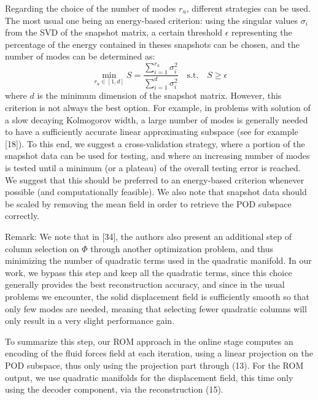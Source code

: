 \documentclass[11pt]{article}
\begin{document}
Regarding the choice of the number of modes $r_u$, different strategies can be used. The most usual one being an energy-based criterion: using the singular values $\sigma_i$ from the SVD of the snapshot matrix, a certain threshold $\epsilon$ representing the percentage of the energy contained in theses snapshots can be chosen, and the number of modes can be determined as:
\begin{equation}
\tag{18}
\min_{r_u \in [1,d]}
S =
\frac{\sum_{i=1}^{r_u}\sigma_i^{2}}{\sum_{i=1}^{d}\sigma_i^{2}}
\quad \text{s.t.} \quad S \ge \epsilon
\end{equation}
where $d$ is the minimum dimension of the snapshot matrix. However, this criterion is not always the best option. For example, in problems with solution of a slow decaying Kolmogorov width, a large number of modes is generally needed to have a sufficiently accurate linear approximating subspace (see for example [18]). To this end, we suggest a cross-validation strategy, where a portion of the snapshot data can be used for testing, and where an increasing number of modes is tested until a minimum (or a plateau) of the overall testing error is reached. We suggest that this should be preferred to an energy-based criterion whenever possible (and computationally feasible). We also note that snapshot data should be scaled by removing the mean field in order to retrieve the POD subspace correctly.

Remark: We note that in [34], the authors also present an additional step of column selection on $\Phi$ through another optimization problem, and thus minimizing the number of quadratic terms used in the quadratic manifold. In our work, we bypass this step and keep all the quadratic terms, since this choice generally provides the best reconstruction accuracy, and since in the usual problems we encounter, the solid displacement field is sufficiently smooth so that only few modes are needed, meaning that selecting fewer quadratic columns will only result in a very slight performance gain.

To summarize this step, our ROM approach in the online stage computes an encoding of the fluid forces field at each iteration, using a linear projection on the POD subspace, thus only using the projection part through (13). For the ROM output, we use quadratic manifolds for the displacement field, this time only using the decoder component, via the reconstruction (15).
\end{document}
